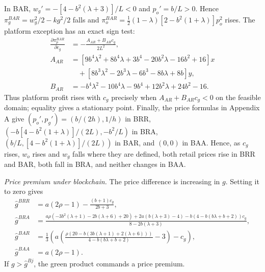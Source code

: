 \documentclass[preprint,review,12pt,authoryear,nopreprintline]{elsarticle}
\theoremstyle{definition}
\begin{document}
In BAR, $w_g'=-[4-b^2(\lambda+3)]/L<0$ and $p_o'=b/L>0$. Hence $\pi_g^{BAR}=w_g^2/2-kg^2/2$ falls and $\pi_o^{BAR}=\frac12(1-\lambda)[2-b^2(1+\lambda)]p_o^2$ rises. The platform exception has an exact sign test:
\begin{align*}
\frac{\partial\pi_p^{BAR}}{\partial c_g}&=-\frac{A_{AR}+B_{AR}c_g}{2L^2},\\
A_{AR}&=[9b^4\lambda^2+8b^4\lambda+3b^4-20b^2\lambda-16b^2+16]x\\
&\quad+[8b^3\lambda^2-2b^3\lambda-6b^3-8b\lambda+8b]y,\\
B_{AR}&=-b^4\lambda^2-10b^4\lambda-9b^4+12b^2\lambda+24b^2-16.
\end{align*}
Thus platform profit rises with $c_g$ precisely when $A_{AR}+B_{AR}c_g<0$ on the feasible domain; equality gives a stationary point. Finally, the price formulas in Appendix A give $(p_o',p_g')=(b/(2h),1/h)$ in BRR, $(-b[4-b^2(1+\lambda)]/(2L),-b^2/L)$ in BRA, $(b/L,[4-b^2(1+\lambda)]/(2L))$ in BAR, and $(0,0)$ in BAA. Hence, as $c_g$ rises, $w_o$ rises and $w_g$ falls where they are defined, both retail prices rise in BRR and BAR, both fall in BRA, and neither changes in BAA.

\noindent \textit{Price premium under blockchain.}
The price difference is increasing in $g$. Setting it to zero gives
\begin{align*}
\hat{g}^{BRR}&=a(2\rho-1)-\frac{(b+1)c_g}{2b+3},\\
\hat{g}^{BRA}&=\frac{a\rho(-3b^2(\lambda+1)-2b(\lambda+6)+20)+2a(b(\lambda+3)-4)-b(4-b(b\lambda+b+2))c_g}{8-2b(\lambda+3)},\\
\hat{g}^{BAR}&=\frac{1}{3}\left(a\left(\frac{\rho(20-b(3b(\lambda+1)+2(\lambda+6)))}{4-b(b\lambda+b+2)}-3\right)-c_g\right),\\
\hat{g}^{BAA}&=a(2\rho-1).
\end{align*}
If $g>\hat{g}^{Bj}$, the green product commands a price premium.
\end{document}
